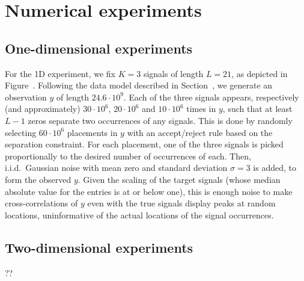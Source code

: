 \documentclass[english,11pt]{article}
\newcommand{\TODO}[1]{{\color{red}{[#1]}}}
\numberwithin{equation}{section}
\theoremstyle{plain}
\theoremstyle{definition}
\theoremstyle{remark}
\theoremstyle{plain}
\theoremstyle{remark}
\theoremstyle{plain}
\theoremstyle{plain}
\begin{document}
\section{Numerical experiments}   \label{sec:numerics}

\TODO{Here we should say that we can afford to work only with non-biased terms}


\subsection{One-dimensional experiments}


For the 1D experiment, we fix $K = 3$ signals of length $L = 21$, as depicted in Figure~\TODO{ref}. Following the data model described in Section~\TODO{ref}, we generate an observation $y$ of length $24.6 \cdot 10^9$. Each of the three signals appears, respectively (and approximately) $30 \cdot 10^6$, $20 \cdot 10^6$ and $10 \cdot 10^6$ times in $y$, such that at least $L-1$ zeros separate two occurrences of any signals. This is done by randomly selecting $60 \cdot 10^6$ placements in $y$ with an accept/reject rule based on the separation constraint. For each placement, one of the three signals is picked proportionally to the desired number of occurrences of each. Then, i.i.d.\ Gaussian noise with mean zero and standard deviation $\sigma = 3$ is added, to form the observed $y$. Given the scaling of the target signals (whose median absolute value for the entries is at or below one), this is enough noise to make cross-correlations of $y$ even with the true signals display peaks at random locations, uninformative of the actual locations of the signal occurrences.




\subsection{Two-dimensional experiments} 


?? 
\end{document}
